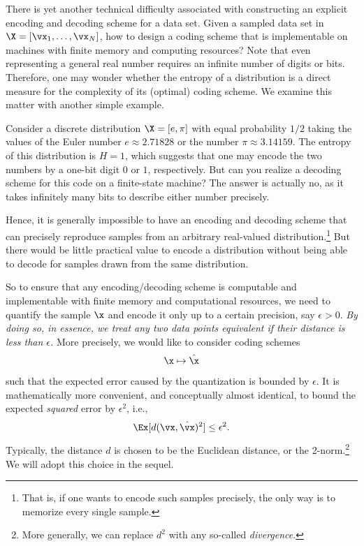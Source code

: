 \documentclass[../../book-main.tex]{subfiles}
\begin{document}
There is yet another technical difficulty associated with constructing an explicit encoding and decoding scheme for a data set. Given a sampled data set in $\X = [\vx_1, \ldots, \vx_N]$, how to design a coding scheme that is implementable on machines with finite memory and computing resources? Note that even representing a general real number requires an infinite number of digits or bits. Therefore, one may wonder whether the entropy of a distribution is a direct measure for the complexity of its (optimal) coding scheme. We examine this matter with another simple example.
\begin{example}[Precision] \label{eg:two-inrational}
	Consider a discrete distribution $\X = [e, \pi]$ with equal probability $1/2$ taking the values of the Euler number $e \approx 2.71828$ or the number $\pi \approx 3.14159$. The entropy of this distribution is $H =1$, which suggests that one may encode the two numbers by a one-bit digit $0$ or $1$, respectively. But can you realize a decoding scheme for this code on a finite-state machine? The answer is actually no, as it takes infinitely many bits to describe either number precisely.
\end{example}

Hence, it is generally impossible to have an encoding and decoding scheme that can precisely reproduce samples from an arbitrary real-valued distribution.\footnote{That is, if one wants to encode such samples precisely, the only way is to memorize every single sample. } But there would be little practical value to encode a distribution without being able to decode for samples drawn from the same distribution.

So to ensure that any encoding/decoding scheme is computable and implementable
with finite memory and computational resources, we need to quantify the sample $\x$ and encode it only up to a certain precision, say $\epsilon > 0$. {\em By doing so, in essence, we treat any two data points equivalent if their distance is less than $\epsilon$.} More precisely, we would like to consider coding schemes
\begin{equation}
	\x \mapsto \hat \x
\end{equation}
such that the expected error caused by the quantization is bounded by $\epsilon$. It is mathematically more convenient, and conceptually almost identical, to bound the expected \textit{squared} error by \(\epsilon^{2}\), i.e., 
\begin{equation}
	\Ex[d(\vx, \hat \vx)^{2}] \le \epsilon^{2}.
\end{equation}
Typically, the distance \(d\) is chosen to be the Euclidean distance, or the
2-norm.\footnote{More generally, we can replace \(d^{2}\) with any so-called
\textit{divergence}.} We will adopt this choice in the sequel.
\end{document}
